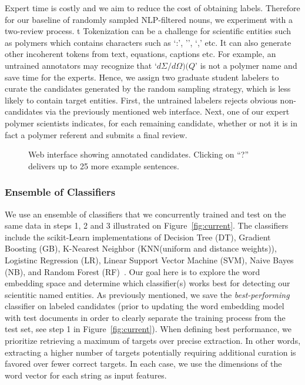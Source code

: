 Expert time is costly and we aim to reduce the cost of obtaining labels.
Therefore for our baseline of randomly sampled NLP-filtered nouns, we experiment with a two-review process. t
Tokenization can be a challenge for scientific entities such as polymers which contains characters such as `:', '\textendash', `,' etc. It can also generate other incoherent tokens from text, equations, captions etc.
For example, an untrained annotators may recognize that `$d\Sigma/d\Omega)(Q$' is not a polymer name and save time for the experts.
Hence, we assign two graduate student labelers to curate the candidates generated by the random sampling strategy, which is less likely to contain target entities.
First, the untrained labelers rejects obvious non-candidates via the previously mentioned web interface. 
Next, one of our expert polymer scientists indicates, for each remaining
candidate, whether or not it is in fact a polymer referent and submits a final review.\\


\begin{figure}
\centering
{}
\caption{\label{fig:polyner} Web interface showing annotated candidates.
Clicking on ``?'' delivers up to 25 more example sentences.
}
\end{figure}

\subsubsection{Ensemble of Classifiers}
We use an ensemble of classifiers that we concurrently trained and test on the same data in steps 1, 2 and 3 illustrated on Figure~\ref{fig:current}.
The classifiers include the scikit-Learn implementations of Decision Tree (DT), Gradient Boosting (GB), K-Nearest Neighbor (KNN(uniform and distance weights)), Logistinc Regression (LR), Linear Support Vector Machine (SVM), Naive Bayes (NB), and Random Forest (RF)~\cite{scikit-learn}. 
Our goal here is to explore the word embedding space and determine which classifier(s) works best for detecting our scientitic named entities.
As previously mentioned, we save the \textit{best-performing} classifier on labeled candidates (prior to updating the word embedding model  with test documents in order to clearly separate the training process from the test set, see step 1 in Figure~\ref{fig:current}).
When defining best performance, we prioritize retrieving a maximum of targets over precise extraction.
In other words, extracting a higher number of targets potentially requiring additional curation is favored over fewer correct targets.
In each case, we use the dimensions of the word vector for each string as input features.



